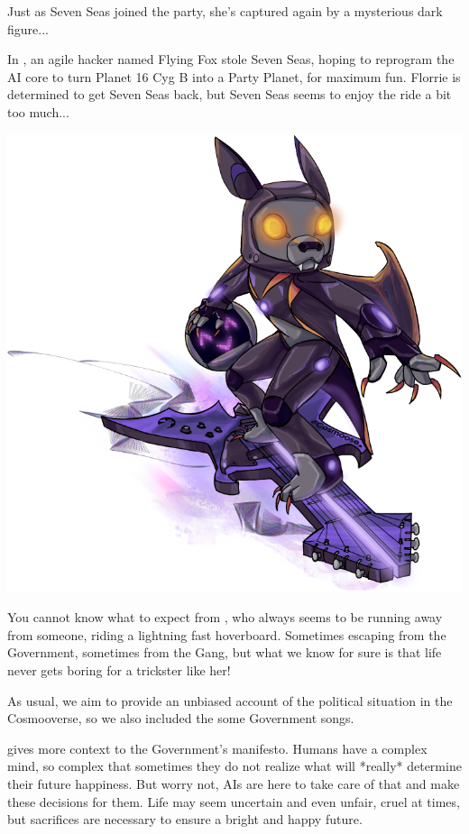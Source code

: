 
Just as Seven Seas joined the party, she's captured again by a mysterious dark figure...

In , an agile hacker named Flying Fox stole Seven Seas, hoping to reprogram the AI core to turn Planet 16 Cyg B into a Party Planet, for maximum fun. Florrie is determined to get Seven Seas back, but Seven Seas seems to enjoy the ride a bit too much...\\


\begin{minipage}{0.4\textwidth}
\includegraphics[width=.9\textwidth]{Assets/flyingfox_s}
\hfill
\end{minipage}
\begin{minipage}{0.7\textwidth}
You cannot know what to expect from , who always seems to be running away from someone, riding a lightning fast hoverboard. Sometimes escaping from the Government, sometimes from the Gang, but what we know for sure is that life never gets boring for a trickster like her!\\
\hfill 
\end{minipage}
\vspace{.3cm}

As usual, we aim to provide an unbiased account of the political situation in the Cosmooverse, so we also included the some Government songs.

 gives more context to the Government’s manifesto. Humans have a complex mind, so complex that sometimes they do not realize what will *really* determine their future happiness. But worry not, AIs are here to take care of that and make these decisions for them. Life may seem uncertain and even unfair, cruel at times, but sacrifices are necessary to ensure a bright and happy future.

\clearpage
